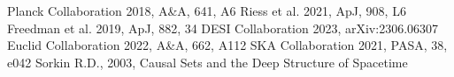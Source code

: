\documentclass[aps,prl,twocolumn,groupedaddress]{revtex4-2}
\begin{document}
\begin{thebibliography}{9}
 Planck Collaboration 2018, A\&A, 641, A6
 Riess et al. 2021, ApJ, 908, L6
 Freedman et al. 2019, ApJ, 882, 34
 DESI Collaboration 2023, arXiv:2306.06307
 Euclid Collaboration 2022, A\&A, 662, A112
 SKA Collaboration 2021, PASA, 38, e042
 Sorkin R.D., 2003, Causal Sets and the Deep Structure of Spacetime
\end{thebibliography}
\end{document}

